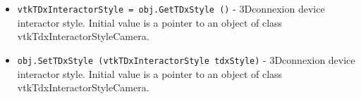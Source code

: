\begin{itemize}
\item  \verb|vtkTDxInteractorStyle = obj.GetTDxStyle ()| -  3Dconnexion device interactor style. Initial value is a pointer to an
 object of class vtkTdxInteractorStyleCamera.

\item  \verb|obj.SetTDxStyle (vtkTDxInteractorStyle tdxStyle)| -  3Dconnexion device interactor style. Initial value is a pointer to an
 object of class vtkTdxInteractorStyleCamera.

\end{itemize}
